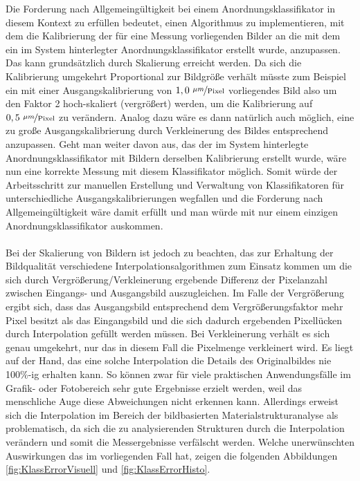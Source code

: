 \documentclass[
fontsize=10pt, 
listof = totoc,
parskip = half	
]{report}
\begin{document}
Die Forderung nach Allgemeingültigkeit bei einem Anordnungsklassifikator in diesem Kontext zu erfüllen bedeutet, einen Algorithmus zu implementieren, mit dem die Kalibrierung der für eine Messung vorliegenden Bilder an die mit dem ein im System hinterlegter Anordnungsklassifikator erstellt wurde, anzupassen. Das kann grundsätzlich durch Skalierung erreicht werden. Da sich die Kalibrierung umgekehrt Proportional zur Bildgröße verhält müsste zum Beispiel ein mit einer Ausgangskalibrierung von $1,0~\nicefrac{\mu m}{\text{Pixel}}$ vorliegendes Bild also um den Faktor 2 hoch-skaliert (vergrößert) werden, um die Kalibrierung auf $0,5~\nicefrac{\mu m}{\text{Pixel}}$ zu verändern. Analog dazu wäre es dann natürlich auch möglich, eine zu große Ausgangskalibrierung durch Verkleinerung des Bildes entsprechend anzupassen. Geht man weiter davon aus, das der im System hinterlegte Anordnungsklassifikator mit Bildern derselben Kalibrierung erstellt wurde, wäre nun eine korrekte Messung mit diesem Klassifikator möglich. Somit würde der Arbeitsschritt zur manuellen Erstellung und Verwaltung von Klassifikatoren für unterschiedliche Ausgangskalibrierungen wegfallen und die Forderung nach Allgemeingültigkeit wäre damit erfüllt und man würde mit nur einem einzigen Anordnungsklassifikator auskommen.
\\\\
Bei der Skalierung von Bildern ist jedoch zu beachten, das zur Erhaltung der Bildqualität verschiedene Interpolationsalgorithmen zum Einsatz kommen um die sich durch Vergrößerung/Verkleinerung ergebende Differenz der Pixelanzahl zwischen Eingangs- und Ausgangsbild auszugleichen. Im Falle der Vergrößerung ergibt sich, dass das Ausgangsbild entsprechend dem Vergrößerungsfaktor mehr Pixel besitzt als das Eingangsbild und die sich dadurch ergebenden Pixellücken durch Interpolation gefüllt werden müssen. Bei Verkleinerung verhält es sich genau umgekehrt, nur das in diesem Fall die Pixelmenge verkleinert wird. Es liegt auf der Hand, das eine solche Interpolation die Details des Originalbildes nie 100\%-ig erhalten kann. So können zwar für viele praktischen Anwendungsfälle im Grafik- oder Fotobereich sehr gute Ergebnisse erzielt werden, weil das menschliche Auge diese Abweichungen nicht erkennen kann. Allerdings erweist sich die Interpolation im Bereich der bildbasierten Materialstrukturanalyse als problematisch, da sich  die zu analysierenden Strukturen durch die Interpolation verändern und somit die Messergebnisse verfälscht werden. Welche unerwünschten Auswirkungen das im vorliegenden Fall hat, zeigen die folgenden Abbildungen \ref{fig:KlassErrorVisuell} und \ref{fig:KlassErrorHisto}.
\end{document}
